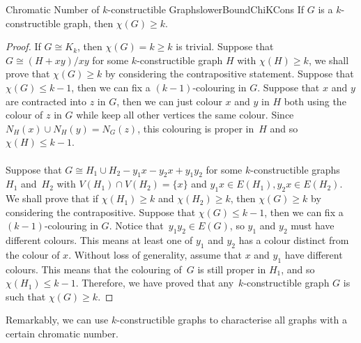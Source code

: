 \documentclass[math]{amznotes}
\theoremstyle{remark}
\newcommand{\0}{\mathbf{0}}
\newcommand{\1}{\mathbf{1}}
\begin{document}
\begin{probox}{Chromatic Number of $k$-constructible Graphs}{lowerBoundChiKCons}
    If $G$ is a $k$-constructible graph, then $\chi(G) \geq k$.
    \tcblower
    \begin{proof}
        If $G \cong K_k$, then $\chi(G) = k \geq k$ is trivial. Suppose that $G \cong (H + xy)/xy$ for some $k$-constructible graph $H$ with $\chi(H) \geq k$, we shall prove that $\chi(G) \geq k$ by considering the contrapositive statement. Suppose that $\chi(G) \leq k - 1$, then we can fix a $(k - 1)$-colouring in $G$. Suppose that $x$ and $y$ are contracted into $z$ in $G$, then we can just colour $x$ and $y$ in $H$ both using the colour of $z$ in $G$ while keep all other vertices the same colour. Since $N_H(x) \cup N_H(y) = N_G(z)$, this colouring is proper in~$H$ and so $\chi(H) \leq k - 1$. 
        \\\\
        Suppose that $G \cong H_1 \cup H_2 - y_1x - y_2x + y_1y_2$ for some $k$-constructible graphs~$H_1$ and~$H_2$ with $V(H_1) \cap V(H_2) = \{x\}$ and $y_1x \in E(H_1), y_2x \in E(H_2)$. We shall prove that if $\chi(H_1) \geq k$ and $\chi(H_2) \geq k$, then $\chi(G) \geq k$ by considering the contrapositive. Suppose that $\chi(G) \leq k - 1$, then we can fix a $(k - 1)$-colouring in $G$. Notice that~$y_1y_2 \in E(G)$, so $y_1$ and $y_2$ must have different colours. This means at least one of $y_1$ and $y_2$ has a colour distinct from the colour of $x$. Without loss of generality, assume that $x$ and $y_1$ have different colours. This means that the colouring of~$G$ is still proper in $H_1$, and so $\chi(H_1) \leq k - 1$. Therefore, we have proved that any~$k$-constructible graph $G$ is such that $\chi(G) \geq k$.
    \end{proof}
\end{probox}
Remarkably, we can use $k$-constructible graphs to characterise all graphs with a certain chromatic number.
\end{document}
